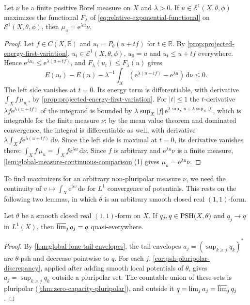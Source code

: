 \begin{lemma}\label{lem:relative-exponential-maximizer-equation}
Let $\nu$ be a finite positive Borel measure on $X$ and $\lambda>0$. If $u\in\mathcal E^1(X,\theta,\phi)$ maximizes the functional $F_\lambda$ of \eqref{eq:relative-exponential-functional} on $\mathcal E^1(X,\theta,\phi)$, then $\mu_u=\mathrm e^{\lambda u}\nu$.
\end{lemma}
\begin{proof}
Let $f\in C(X,\mathbb R)$ and $u_t=P_\theta(u+tf)$ for $t\in\mathbb R$. By \cref{prop:projected-energy-first-variation}, $u_t\in\mathcal E^1(X,\theta,\phi)$, $u_0=u$ and $u_t\leq u+tf$ everywhere. Hence $\mathrm e^{\lambda u_t}\leq\mathrm e^{\lambda(u+tf)}$, and $F_\lambda(u_t)\leq F_\lambda(u)$ gives
\[
 E(u_t)-E(u)-\lambda^{-1}
      \int_X\left(\mathrm e^{\lambda(u+tf)}-\mathrm e^{\lambda u}\right)
                         \,\mathrm d\nu\leq0.
\]
The left side vanishes at $t=0$. Its energy term is differentiable, with derivative $\int_Xf\,\mu_{u_t}$, by \cref{prop:projected-energy-first-variation}. For $|t|\leq1$ the $t$-derivative $\lambda f\mathrm e^{\lambda(u+tf)}$ of the integrand is bounded by $\lambda\sup_X|f|\,\mathrm e^{\lambda\sup_Xu+\lambda\sup_X|f|}$, which is integrable for the finite measure $\nu$; by the mean value theorem and dominated convergence, the integral is differentiable as well, with derivative $\lambda\int_Xf\mathrm e^{\lambda(u+tf)}\,\mathrm d\nu$. Since the left side is maximal at $t=0$, its derivative vanishes there: $\int_Xf\,\mu_u=\int_Xf\mathrm e^{\lambda u}\,\mathrm d\nu$. Since $f$ is arbitrary and $\mathrm e^{\lambda u}\nu$ is a finite measure, \cref{lem:global-measure-continuous-comparison}(1) gives $\mu_u=\mathrm e^{\lambda u}\nu$.
\end{proof}

To find maximizers for an arbitrary non-pluripolar measure $\nu$, we need the continuity of $v\mapsto\int_X\mathrm e^{\lambda v}\,\mathrm d\nu$ for $L^1$ convergence of potentials. This rests on the following two lemmas, in which $\theta$ is an arbitrary smooth closed real $(1,1)$-form.

\begin{lemma}\label{lem:psh-lone-quasieverywhere-limsup}
Let $\theta$ be a smooth closed real $(1,1)$-form on $X$. If $q_j,q\in\mathrm{PSH}(X,\theta)$ and $q_j\to q$ in $L^1(X)$, then $\varlimsup_jq_j=q$ quasi-everywhere.
\end{lemma}
\begin{proof}
By \cref{lem:global-lone-tail-envelopes}, the tail envelopes $a_j=(\sup_{k\geq j}q_k)^*$ are $\theta$-psh and decrease pointwise to $q$. For each $j$, \cref{cor:psh-pluripolar-discrepancy}, applied after adding smooth local potentials of $\theta$, gives $a_j=\sup_{k\geq j}q_k$ outside a pluripolar set. The countable union of these sets is pluripolar (\cref{thm:zero-capacity-pluripolar}), and outside it $q=\lim_ja_j=\varlimsup_jq_j$.
\end{proof}


